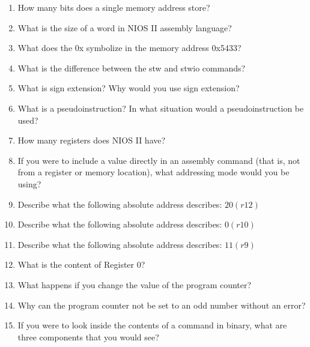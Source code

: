 \documentclass[10pt]{article}
\begin{document}
\begin{itemize}
\begin{enumerate}
    \vspace{1in}

\newpage

\item How many bits does a single memory address store?

\item What is the size of a word in NIOS II assembly language?

\item What does the 0x symbolize in the memory address 0x5433?

\item What is the difference between the stw and stwio commands?

\item What is sign extension?  Why would you use sign extension?

\item What is a pseudoinstruction?  In what situation would a pseudoinstruction be used?

\item How many registers does NIOS II have?

\item If you were to include a value directly in an assembly command (that is, not from a register or memory location), what addressing mode would you be using?

\item Describe what the following absolute address describes: $20(r12)$

\item Describe what the following absolute address describes: $0(r10)$

\item Describe what the following absolute address describes: $11(r9)$

\item What is the content of Register 0?

\item What happens if you change the value of the program counter?

\item Why can the program counter not be set to an odd number without an error?

\item If you were to look inside the contents of a command in binary, what are three components that you would see?



\end{enumerate}

\end{itemize}
\end{document}
